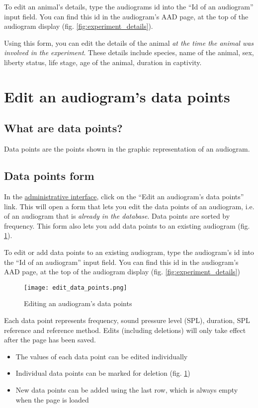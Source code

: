 \documentclass{article}
\begin{document}
To edit an animal's details, type the audiograms id into the ``Id of an audiogram'' input field. You can find this id in the audiogram's AAD page, at the top of the audiogram display (fig. \ref{fig:experiment_details}).

Using this form, you can edit the details of the animal \emph{at the time the animal was involved in the experiment}. These details include species, name of the animal, sex, liberty status, life stage, age of the animal, duration in captivity. 

\section{Edit an audiogram's data points}
\subsection{What are data points?}
Data points are the points shown in the graphic representation of an audiogram.

\subsection{Data points form}
In the \href{https://animalaudiograms.museumfuernaturkunde.berlin/admin/v1/start}{administrative interface}, click on the ``Edit an audiogram's data points'' link. This will open a form that lets you edit the data points of an audiogram, i.e. of an audiogram that is \emph{already in the database}. Data points are sorted by frequency. This form also lets you add data points to an existing audiogram (fig. \ref{fig:edit_data_points}).

To edit or add data points to an existing audiogram, type the audiogram's id into the ``Id of an audiogram'' input field. You can find this id in the audiogram's AAD page, at the top of the audiogram display (fig. \ref{fig:experiment_details})

\begin{figure}
\texttt{[image: edit\_data\_points.png]}
\caption{Editing an audiogram's data points}
\label{fig:edit_data_points}
\end{figure}

Each data point represents frequency, sound pressure level (SPL), duration, SPL reference and reference method. Edits (including deletions) will only take effect after the page has been saved.
\begin{itemize}
\item{The values of each data point can be edited individually}
\item{Individual data points can be marked for deletion (fig. \ref{fig:edit_data_points})}
\item{New data points can be added using the last row, which is always empty when the page is loaded}
\end{itemize}
\end{document}
